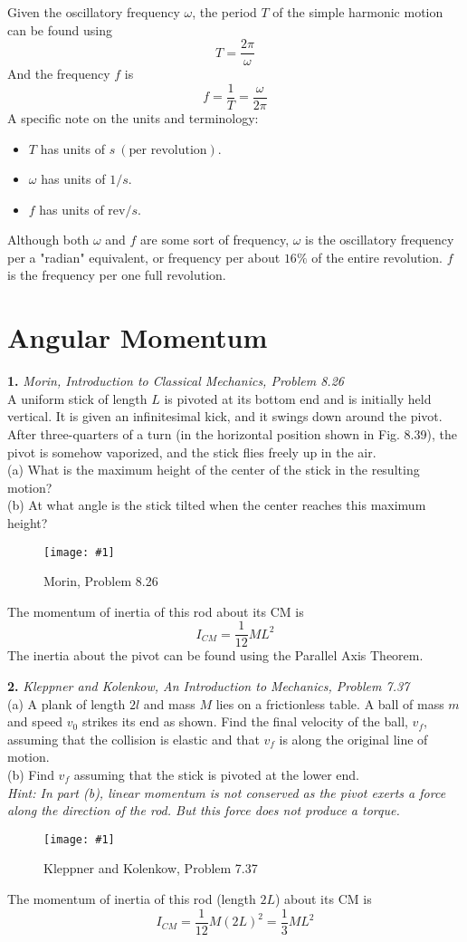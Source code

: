 \documentclass[11pt]{article}
\newcommand{\fig}[4]{
    \begin{figure}[H]
        \centering
        \texttt{[image: \#1]}
        \caption{#2}
        \label{exp4fit}
    \end{figure}
}
\theoremstyle{gangnamstyle}{\newtheorem{definition}{Definition}[]}
\theoremstyle{gangnamstyle}{\newtheorem{example}{Example}[]}
\theoremstyle{gangnamstyle}{\newtheorem{problem}{Problem}[]}
\begin{document}
Given the oscillatory frequency $\omega$, the period $T$ of the simple harmonic motion can be found using
\[ T = \frac{2\pi}{\omega} \]
And the frequency $f$ is
\[ f = \frac{1}{T} = \frac{\omega}{2\pi} \]
A specific note on the units and terminology: 
\begin{itemize}
\item $T$ has units of $s \ (\text{per revolution})$. 
\item $\omega$ has units of $1/s$. 
\item $f$ has units of $\text{rev} / s$. 
\end{itemize}
Although both $\omega$ and $f$ are some sort of frequency, $\omega$ is the oscillatory frequency per a "radian" equivalent, or frequency per about $16\%$ of the entire revolution. $f$ is the frequency per one full revolution. 

\pagebreak

\section{Angular Momentum}

\textbf{1.} \textit{Morin, Introduction to Classical Mechanics, Problem 8.26} \\
A uniform stick of length $L$ is pivoted at its bottom end and is initially held vertical. It is given an infinitesimal kick, and it swings down around the pivot. After three-quarters of a turn (in the horizontal position shown in Fig. 8.39), the pivot is somehow vaporized, and the stick flies freely up in the air. \\
(a) What is the maximum height of the center of the stick in the resulting motion? \\
(b) At what angle is the stick tilted when the center reaches this maximum height? \\
\fig{figs/0718/m826.png}{Morin, Problem 8.26}{0.5}{0}
The momentum of inertia of this rod about its CM is
\[ I_{CM} = \frac{1}{12}ML^2 \]
The inertia about the pivot can be found using the Parallel Axis Theorem. 

\pagebreak

\textbf{2.} \textit{Kleppner and Kolenkow, An Introduction to Mechanics, Problem 7.37} \\
(a) A plank of length $2l$ and mass $M$ lies on a frictionless table. A ball of mass $m$ and speed $v_0$ strikes its end as shown. Find the final velocity of the ball, $v_f$, assuming that the collision is elastic and that $v_f$ is along the original line of motion. \\
(b) Find $v_f$ assuming that the stick is pivoted at the lower end. \\
\textit{Hint: In part (b), linear momentum is not conserved as the pivot exerts a force along the direction of the rod. But this force does not produce a torque. }
\fig{figs/0718/kk737.png}{Kleppner and Kolenkow, Problem 7.37}{0.5}{0}
The momentum of inertia of this rod (length $2L$) about its CM is
\[ I_{CM} = \frac{1}{12}M(2L)^2 = \frac{1}{3}ML^2 \]
\end{document}

